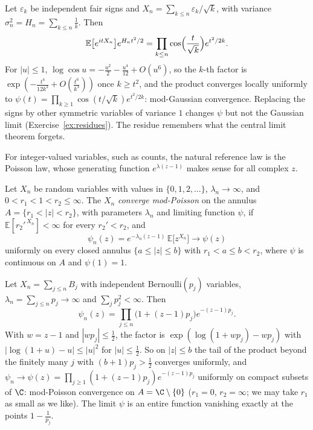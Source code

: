 \begin{example}\label{ex:harmonicwalk}
Let $\varepsilon_k$ be independent fair signs and $X_n=\sum_{k\le n}\varepsilon_k/\sqrt k$, with variance $\sigma_n^2=H_n=\sum_{k\le n}\frac1k$. Then
\[
\mathbb E\bigl[e^{itX_n}\bigr]e^{H_nt^2/2}=\prod_{k\le n}\cos\Bigl(\frac t{\sqrt k}\Bigr)e^{t^2/2k}.
\]
For $|u|\le1$, $\log\cos u=-\frac{u^2}2-\frac{u^4}{12}+O(u^6)$, so the $k$-th factor is $\exp(-\frac{t^4}{12k^2}+O(\frac{t^6}{k^3}))$ once $k\ge t^2$, and the product converges locally uniformly to $\psi(t)=\prod_{k\ge1}\cos(t/\sqrt k)e^{t^2/2k}$:
mod-Gaussian convergence. Replacing the signs by other symmetric variables of variance $1$ changes $\psi$ but not the Gaussian limit (Exercise~\ref{ex:residues}). The residue remembers what the central limit theorem forgets.
\end{example}

For integer-valued variables, such as counts, the natural reference law is the Poisson law, whose generating function $e^{\lambda(z-1)}$ makes sense for all complex $z$.

\begin{definition}\label{def:modpoisson}
Let $X_n$ be random variables with values in $\{0,1,2,\dots\}$, $\lambda_n\to\infty$, and $0<r_1<1<r_2\le\infty$. The $X_n$ \emph{converge mod-Poisson} on the annulus $A=\{r_1<|z|<r_2\}$, with parameters $\lambda_n$ and limiting function
$\psi$, if $\mathbb E[r_2'^{\,X_n}]<\infty$ for every $r_2'<r_2$, and
\[
\psi_n(z)=e^{-\lambda_n(z-1)}\,\mathbb E\bigl[z^{X_n}\bigr]\longrightarrow\psi(z)
\]
uniformly on every closed annulus $\{a\le|z|\le b\}$ with $r_1<a\le b<r_2$, where $\psi$ is continuous on $A$ and $\psi(1)=1$.
\end{definition}

\begin{example}\label{ex:bernsums}
Let $X_n=\sum_{j\le n}B_j$ with independent Bernoulli$(p_j)$ variables, $\lambda_n=\sum_{j\le n}p_j\to\infty$ and $\sum_jp_j^2<\infty$. Then
\[
\psi_n(z)=\prod_{j\le n}\bigl(1+(z-1)p_j\bigr)e^{-(z-1)p_j}.
\]
With $w=z-1$ and $|wp_j|\le\frac12$, the factor is $\exp(\log(1+wp_j)-wp_j)$ with $|\log(1+u)-u|\le|u|^2$ for $|u|\le\frac12$. So on $|z|\le b$ the tail of the product beyond the finitely many $j$ with $(b+1)p_j>\frac12$ converges
uniformly, and $\psi_n\to\psi(z)=\prod_{j\ge1}(1+(z-1)p_j)e^{-(z-1)p_j}$ uniformly on compact subsets of $\C$: mod-Poisson convergence on $A=\C\setminus\{0\}$ ($r_1=0$, $r_2=\infty$; we may take $r_1$ as small as we like). The limit $\psi$ is an entire function vanishing
exactly at the points $1-\frac1{p_j}$.
\end{example}

